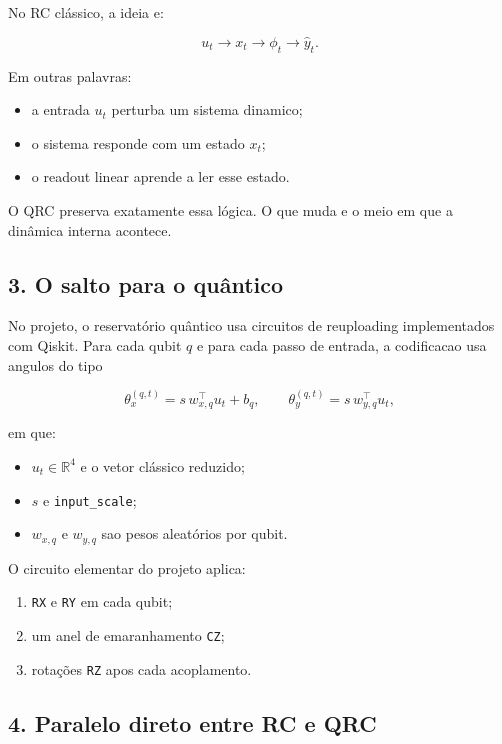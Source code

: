 \documentclass[12pt]{article}
\providecommand{\tightlist}{%
          \setlength{\itemsep}{0pt}\setlength{\parskip}{0pt}}
\begin{document}
No RC clássico, a ideia e:

\[
u_t \longrightarrow x_t \longrightarrow \phi_t \longrightarrow \hat{y}_t.
\]

Em outras palavras:

\begin{itemize}
\tightlist
\item
  a entrada \(u_t\) perturba um sistema dinamico;
\item
  o sistema responde com um estado \(x_t\);
\item
  o readout linear aprende a ler esse estado.
\end{itemize}

O QRC preserva exatamente essa lógica. O que muda e o meio em que a dinâmica interna acontece.

\subsection{3. O salto para o quântico}\label{3-o-salto-para-o-quuxe2ntico}

No projeto, o reservatório quântico usa circuitos de reuploading implementados com Qiskit. Para cada qubit \(q\) e para cada passo de entrada, a codificacao usa angulos do tipo

\[
\theta^{(q,t)}_x = s \, w_{x,q}^\top u_t + b_q,
\qquad
\theta^{(q,t)}_y = s \, w_{y,q}^\top u_t,
\]

em que:

\begin{itemize}
\tightlist
\item
  \(u_t \in \mathbb{R}^4\) e o vetor clássico reduzido;
\item
  \(s\) e \texttt{input\_scale};
\item
  \(w_{x,q}\) e \(w_{y,q}\) sao pesos aleatórios por qubit.
\end{itemize}

O circuito elementar do projeto aplica:

\begin{enumerate}
\def\labelenumi{\arabic{enumi}.}
\tightlist
\item
  \texttt{RX} e \texttt{RY} em cada qubit;
\item
  um anel de emaranhamento \texttt{CZ};
\item
  rotações \texttt{RZ} apos cada acoplamento.
\end{enumerate}

\subsection{4. Paralelo direto entre RC e QRC}\label{4-paralelo-direto-entre-rc-e-qrc}
\end{document}
